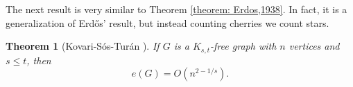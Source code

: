 \documentclass[12pt,twoside,a4paper,bibliography=totocnumbered]{book}
\numberwithin{equation}{section}
\newtheorem{theorem}             {Theorem}[section]
\newtheorem{corollary}	[theorem] {Corollary}
\theoremstyle{remark}
\begin{document}



The next result is very similar to Theorem \ref{theorem: Erdos,1938}. In fact, it is a generalization of Erd\H{o}s' result, but instead counting cherries we count stars.
\begin{theorem}[{Kovari-Sós-Turán \cite{KoSoTu54}}]
If $G$ is a $K_{s,t}$-free graph with $n$ vertices and $s \leq t$, then
$$ e(G) = O (n^{2 - 1/s}). $$
\end{theorem}
\end{document}
